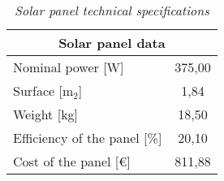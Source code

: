\begin{table}[h]
\centering
\begin{tabular}{|l|c|}
\hline
\multicolumn{2}{|c|}{\cellcolor{bluepoli!40}\textbf{Solar panel data}} \\ \hline
Nominal power {[}W{]}                     & 375,00            \\ \hline
Surface {[}m$_2${]}                       & 1,84              \\ \hline
Weight {[}kg{]}                           & 18,50             \\ \hline
Efficiency of the panel {[}\%{]}          & 20,10             \\ \hline
Cost of the panel {[}€{]}                 & 811,88          \\ \hline
\end{tabular}
\caption{\textit{Solar panel technical specifications \textsuperscript{\cite{enelx}}}}
\label{tab:pvdata}
\end{table}